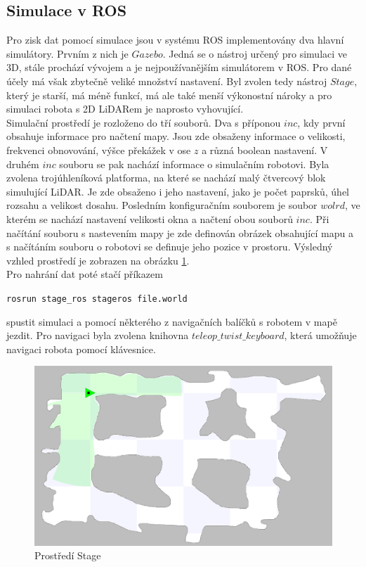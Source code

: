\documentclass[12pt]{report}
\begin{document}
\subsection{Simulace v ROS}
Pro zisk dat pomocí simulace jsou v systému ROS implementovány dva hlavní simulátory. Prvním z nich je $Gazebo$. Jedná se o nástroj určený pro simulaci ve 3D, stále prochází vývojem a je nejpoužívanějším simulátorem v ROS. Pro dané účely má však zbytečně veliké množství nastavení. Byl zvolen tedy nástroj $Stage$, který je starší, má méně funkcí, má ale také menší výkonostní nároky a pro simulaci robota s 2D LiDARem je naprosto vyhovující.\\
\indent Simulační prostředí je rozloženo do tří souborů. Dva s příponou $inc$, kdy první obsahuje informace pro načtení mapy. Jsou zde obsaženy informace o velikosti, frekvenci obnovování, výšce překážek v ose $z$ a různá boolean nastavení. V druhém $inc$ souboru se pak nachází informace o simulačním robotovi. Byla zvolena trojúhleníková platforma, na které se nachází malý čtvercový blok simulující LiDAR. Je zde obsaženo i jeho nastavení, jako je počet paprsků, úhel rozsahu a velikost dosahu. Posledním konfiguračním souborem je soubor $wolrd$, ve kterém se nachází nastavení velikosti okna a načtení obou souborů $inc$. Při načítání souboru s nastevením mapy je zde definován obrázek obsahující mapu a s načítáním souboru o robotovi se definuje jeho pozice v prostoru. Výsledný vzhled prostředí je zobrazen na obrázku \ref{fig:stage}.\\
Pro nahrání dat poté stačí příkazem
\begin{center}
	\texttt{rosrun stage\_ros stageros file.world}
\end{center}
spustit simulaci a pomocí některého z navigačních balíčků s robotem v mapě jezdit. Pro navigaci byla zvolena knihovna $teleop\_twist\_keyboard$, která umožňuje navigaci robota pomocí klávesnice. 

\begin{figure}[!ht]
	\begin{center}
		\includegraphics[width=0.7\columnwidth]{imgs/stage.png}
	\end{center}
	\caption{Prostředí Stage}
	\label{fig:stage}
\end{figure}
\end{document}
